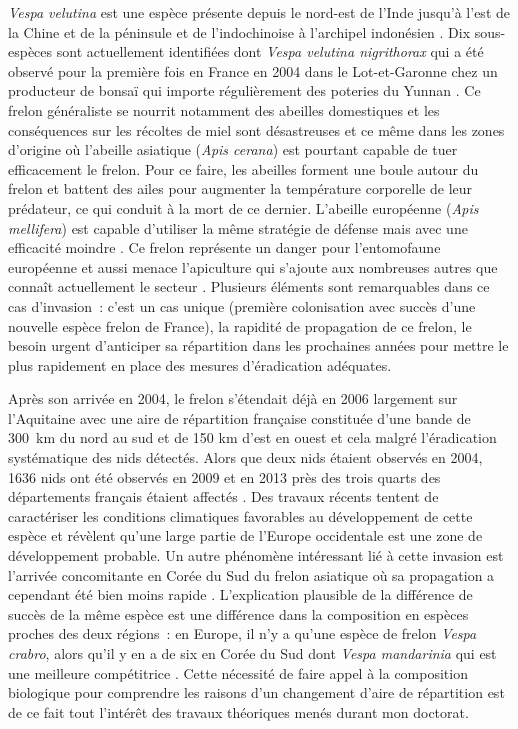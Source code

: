\emph{Vespa velutina} est une espèce présente depuis le nord-est de
l'Inde jusqu'à l'est de la Chine et de la péninsule et de l'indochinoise
à l'archipel indonésien \citep{Villemant2006}. Dix sous-espèces sont
actuellement identifiées dont \emph{Vespa velutina nigrithorax} qui a
été observé pour la première fois en France en 2004 dans le
Lot-et-Garonne chez un producteur de bonsaï qui importe régulièrement
des poteries du Yunnan \citep{Villemant2006}. Ce frelon généraliste se
nourrit notamment des abeilles domestiques et les conséquences sur les
récoltes de miel sont désastreuses et ce même dans les zones d'origine
où l'abeille asiatique (\emph{Apis cerana}) est pourtant capable de tuer
efficacement le frelon. Pour ce faire, les abeilles forment une boule
autour du frelon et battent des ailes pour augmenter la température
corporelle de leur prédateur, ce qui conduit à la mort de ce dernier.
L'abeille européenne (\emph{Apis mellifera}) est capable d'utiliser la
même stratégie de défense mais avec une efficacité moindre
\citep{Villemant2006}. Ce frelon représente un danger pour l'entomofaune
européenne et aussi menace l'apiculture qui s'ajoute aux nombreuses
autres que connaît actuellement le secteur \citep{Vanbergen2013}.
Plusieurs éléments sont remarquables dans ce cas d'invasion~: c'est un
cas unique (première colonisation avec succès d'une nouvelle espèce
frelon de France), la rapidité de propagation de ce frelon, le besoin
urgent d'anticiper sa répartition dans les prochaines années pour mettre
le plus rapidement en place des mesures d'éradication adéquates.

Après son arrivée en 2004, le frelon s'étendait déjà en 2006 largement
sur l'Aquitaine avec une aire de répartition française constituée d'une
bande de 300~km du nord au sud et de 150 km d'est en ouest
\citep{Villemant2006} et cela malgré l'éradication systématique des nids
détectés. Alors que deux nids étaient observés en 2004, 1636 nids ont
été observés en 2009 et en 2013 près des trois quarts des départements
français étaient affectés \citep{Robinet2016}. Des travaux récents
tentent de caractériser les conditions climatiques favorables au
développement de cette espèce \citep{Villemant2011} et révèlent qu'une
large partie de l'Europe occidentale est une zone de développement
probable. Un autre phénomène intéressant lié à cette invasion est
l'arrivée concomitante en Corée du Sud du frelon asiatique où sa
propagation a cependant été bien moins rapide \citep{Villemant2011}.
L'explication plausible de la différence de succès de la même espèce est
une différence dans la composition en espèces proches des deux régions~:
en Europe, il n'y a qu'une espèce de frelon \emph{Vespa crabro}, alors
qu'il y en a de six en Corée du Sud dont \emph{Vespa mandarinia} qui est
une meilleure compétitrice \citep{Villemant2011}. Cette nécessité de
faire appel à la composition biologique pour comprendre les raisons d'un
changement d'aire de répartition est de ce fait tout l'intérêt des
travaux théoriques menés durant mon doctorat.

